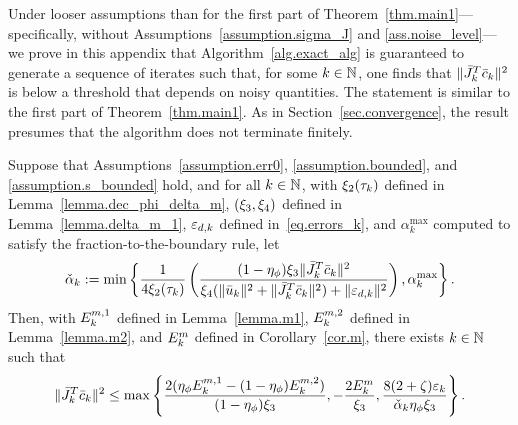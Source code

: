Under looser assumptions than for the first part of Theorem~\ref{thm.main1}---specifically, without Assumptions~\ref{assumption.sigma_J} and \ref{ass.noise_level}---we prove in this appendix that Algorithm~\ref{alg.exact_alg} is guaranteed to generate a sequence of iterates such that, for some $k \in \mathbb{N}$, one finds that $\|{\bar J}_{k }^T {\bar c}_k\|^2$ is below a threshold that depends on noisy quantities.  The statement is similar to the first part of Theorem~\ref{thm.main1}.  As in Section~\ref{sec.convergence}, the result presumes that the algorithm does not terminate finitely.

\begin{theorem}\label{th.Jc}
  Suppose that Assumptions~\ref{assumption.err0}, \ref{assumption.bounded}, and \ref{assumption.s_bounded} hold, and for all $k \in \mathbb{N}$, with $\xi_2(\tau_k)$ defined in Lemma~\ref{lemma.dec_phi_delta_m}, $(\xi_3,\xi_4)$ defined in Lemma~\ref{lemma.delta_m_1}, $\varepsilon_{d,k}$ defined in~\eqref{eq.errors_k}, and $\alpha_k^{\max}$ computed to satisfy the fraction-to-the-boundary rule, let
  \begin{align}\label{eq.alpha_check}
    \check \alpha_k:= \min \left\{ \frac{1}{4 \xi_2(\tau_k)} \left( \frac{(1 - \eta_\phi)\xi_3 \|{\bar J}_k^T {\bar c}_k\|^2}{\xi_4 (\|{\bar u}_k\|^2 + \|{\bar J}_k^T {\bar c}_k \|^2) + \|\varepsilon_{d,k}\|^2} \right), \alpha_k^{\max}\right\}.
  \end{align}
  Then, with $E_k^{m, 1}$ defined in Lemma~\ref{lemma.m1}, $E_k^{m, 2}$ defined in Lemma~\ref{lemma.m2}, and $E_k^m$ defined in Corollary~\ref{cor.m}, there exists $k \in \mathbb{N}$ such that
  \begin{align}\label{eq.stat_cond_2}
    \|{\bar J}_{k }^T {\bar c}_{ k }\|^2 \leq \max\left\{\frac{2 (\eta_\phi E_k^{m, 1} - (1 - \eta_\phi) E_k^{m, 2})}{ (1 - \eta_\phi) \xi_3 }, - \frac{2E_k^m}{\xi_3}, \frac{8(2 + \zeta) \varepsilon_k}{\check \alpha_k \eta_\phi \xi_3} \right\}.
  \end{align}
\end{theorem}

